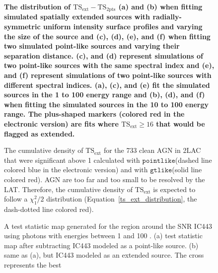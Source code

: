 \documentclass[12pt,preprint]{aastex}
\newif\ifcolorfigure
\newcommand{\gev}{\text{GeV}\xspace}
\newcommand{\tsext}{{\ensuremath{\text{TS}_{\text{ext}}}}\xspace}
\newcommand{\tsinc}{\ensuremath{\text{TS}_{\text{2pts}}}\xspace}
\newcommand{\gtlike}{\ensuremath{\mathtt{gtlike}}\xspace}
\newcommand{\pointlike}{\ensuremath{\mathtt{pointlike}}\xspace}
\newcommand{\newtext}[1]{{\bfseries \color{red}#1}}
\begin{document}
\clearpage
\begin{figure}
    \ifcolorfigure
    \plotone{mc_plots/confusion_plot_color.eps}
    \else
    \fi
    \caption{
    \newtext{
    The distribution of $\tsext-\tsinc$ 
    (a) and (b) when fitting simulated spatially extended sources with
    radially-symmetric uniform intensity surface profiles and varying
    the size of the source and (c), (d), (e), and (f) when fitting two
    simulated point-like sources and varying their separation distance.
    (c), and (d) represent simulations of two point-like sources with
    the same spectral index and (e), and (f) represent simulations of
    two point-like sources with different spectral indices.  (a), (c),
    and (e) fit the simulated sources in the 1 \gev to 100 \gev energy
    range and (b), (d), and (f) when fitting the simulated sources
    in the 10 \gev to 100 \gev energy range. The plus-shaped markers
    (colored red in the electronic version) are fits where $\tsext\ge16$
    that would be flagged as extended.
    }
    }\label{confusion_plot}
  \end{figure}


\clearpage
\begin{figure}
    \ifcolorfigure
      \plotone{source_plots/agn_color.eps}
    \else
    \fi
    \caption{The cumulative density of \tsext for the 733 clean
    AGN in 2LAC that were significant above 1 \gev calculated with \pointlike (dashed line
    colored blue in the electronic version)
    and with \gtlike (solid line colored red).  AGN are too far
    and too small to be resolved by the LAT. Therefore, the cumulative
    density of $\tsext$ is expected to follow a $\chi^2_1/2$ distribution
    (Equation~\ref{ts_ext_distribution}, the dash-dotted line colored
    red).
    }\label{agn_ts_ext}
  \end{figure}

\begin{figure}
  \ifcolorfigure
    \plotone{ic443_plots/res_tsmap_ic443_color.eps}
    \else
    \fi

  \caption{
  A test statistic map generated for the region around the SNR 
  IC443 using 
  photons with energies between
  1 \gev and 100 \gev.  (a) test statistic map after
  subtracting IC443 modeled as a point-like source. (b) same as (a), but
  IC443 modeled as an extended source. The cross represents the best
  }
  \label{res_tsmaps}
\end{figure}
\end{document}
